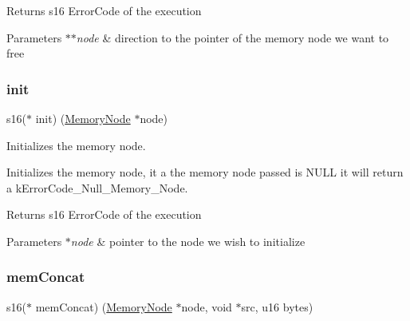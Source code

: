 \begin{DoxyReturn}{Returns}
s16 Error\+Code of the execution 
\end{DoxyReturn}

\begin{DoxyParams}{Parameters}
{\em $\ast$$\ast$node} & direction to the pointer of the memory node we want to free \\
\hline
\end{DoxyParams}
\mbox{\label{structmemory__node__ops__s_a5ebfbdad36c43579a4bd90d91a61c11b}} 
\subsubsection{\texorpdfstring{init}{init}}
{\footnotesize\ttfamily s16($\ast$ init) (\hyperlink{structmemory__node__s}{Memory\+Node} $\ast$node)}



Initializes the memory node. 

Initializes the memory node, it a the memory node passed is N\+U\+LL it will return a k\+Error\+Code\+\_\+\+Null\+\_\+\+Memory\+\_\+\+Node.

\begin{DoxyReturn}{Returns}
s16 Error\+Code of the execution 
\end{DoxyReturn}

\begin{DoxyParams}{Parameters}
{\em $\ast$node} & pointer to the node we wish to initialize \\
\hline
\end{DoxyParams}
\mbox{\label{structmemory__node__ops__s_aaec24f26495e5e53018f5fd686852fdb}} 
\subsubsection{\texorpdfstring{mem\+Concat}{memConcat}}
{\footnotesize\ttfamily s16($\ast$ mem\+Concat) (\hyperlink{structmemory__node__s}{Memory\+Node} $\ast$node, void $\ast$src, u16 bytes)}



